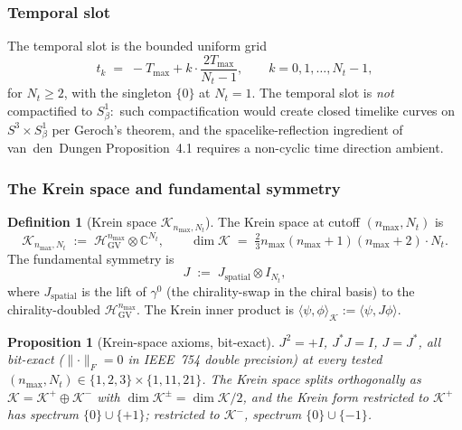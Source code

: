 \documentclass[11pt,a4paper]{article}
\theoremstyle{plain}
\newtheorem{proposition}[theorem]{Proposition}
\theoremstyle{definition}
\newtheorem{definition}[theorem]{Definition}
\newcommand{\nmax}{n_{\max}}
\newcommand{\Nt}{N_t}
\newcommand{\sthree}{S^{3}}
\newcommand{\Hilb}{\mathcal{H}}
\newcommand{\Krein}{\mathcal{K}}
\newcommand{\Frob}[1]{\lVert #1 \rVert_{F}}
\newcommand{\C}{\mathbb{C}}
\begin{document}
\subsubsection{Temporal slot}

The temporal slot is the bounded uniform grid
\begin{equation}\label{eq:t_grid}
   t_k \;=\; -T_{\max} + k \cdot \frac{2 T_{\max}}{\Nt - 1},
   \qquad k = 0, 1, \ldots, \Nt - 1,
\end{equation}
for $\Nt \ge 2$, with the singleton $\{0\}$ at $\Nt = 1$. The temporal
slot is \emph{not} compactified to $S^1_\beta$:\ such compactification
would create closed timelike curves on $\sthree \times S^1_\beta$ per
Geroch's theorem, and the spacelike-reflection ingredient of
van~den~Dungen Proposition~4.1 requires a non-cyclic time direction
ambient.

\subsubsection{The Krein space and fundamental symmetry}

\begin{definition}[Krein space $\Krein_{\nmax, \Nt}$]\label{def:krein_space}
The Krein space at cutoff $(\nmax, \Nt)$ is
\begin{equation}\label{eq:krein_def}
   \Krein_{\nmax, \Nt}
   \;:=\; \Hilb_{\mathrm{GV}}^{\nmax} \otimes \C^{\Nt},
   \qquad
   \dim \Krein \;=\; \tfrac{2}{3} \nmax (\nmax + 1)(\nmax + 2) \cdot \Nt.
\end{equation}
The fundamental symmetry is
\begin{equation}\label{eq:J_def}
   J \;:=\; J_{\mathrm{spatial}} \otimes I_{\Nt},
\end{equation}
where $J_{\mathrm{spatial}}$ is the lift of $\gamma^0$ (the
chirality-swap in the chiral basis) to the chirality-doubled
$\Hilb_{\mathrm{GV}}^{\nmax}$. The Krein inner product is
$\langle \psi, \phi \rangle_{\Krein} := \langle \psi, J \phi \rangle$.
\end{definition}

\begin{proposition}[Krein-space axioms, bit-exact]\label{prop:krein_axioms}
$J^2 = +I$, $J^* J = I$, $J = J^*$, all bit-exact ($\Frob{\cdot} = 0$
in IEEE~754 double precision) at every tested $(\nmax, \Nt) \in
\{1, 2, 3\} \times \{1, 11, 21\}$. The Krein space splits orthogonally
as $\Krein = \Krein^+ \oplus \Krein^-$ with $\dim \Krein^\pm = \dim
\Krein / 2$, and the Krein form restricted to $\Krein^+$ has spectrum
$\{0\} \cup \{+1\}$; restricted to $\Krein^-$, spectrum $\{0\} \cup
\{-1\}$.
\end{proposition}
\end{document}
